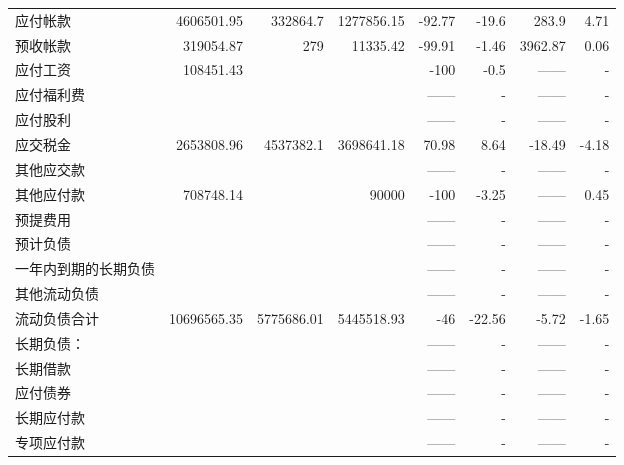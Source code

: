 \begin{longtable}{>{\scriptsize}p{9em}>{\scriptsize}r>{\scriptsize}r>{\scriptsize}r>{\scriptsize}r>{\scriptsize}r>{\scriptsize}r>{\scriptsize}r}
\hspace{2ex}	    应付帐款	&	4606501.95	&	332864.7	&	1277856.15	&	-92.77	&	-19.6	&	283.9	&	4.71	\\
\hspace{2ex}	    预收帐款	&	319054.87	&	279	&	11335.42	&	-99.91	&	-1.46	&	3962.87	&	0.06	\\
\hspace{2ex}	    应付工资	&	108451.43	&		&		&	-100	&	-0.5	&	——	&	- 	\\
\hspace{2ex}	    应付福利费	&		&		&		&	——	&	- 	&	——	&	- 	\\
\hspace{2ex}	    应付股利	&		&		&		&	——	&	- 	&	——	&	- 	\\
\hspace{2ex}	    应交税金	&	2653808.96	&	4537382.1	&	3698641.18	&	70.98	&	8.64	&	-18.49	&	-4.18	\\
\hspace{2ex}	    其他应交款	&		&		&		&	——	&	- 	&	——	&	- 	\\
\hspace{2ex}	    其他应付款	&	708748.14	&		&	90000	&	-100	&	-3.25	&	——	&	0.45	\\
\hspace{2ex}	    预提费用	&		&		&		&	——	&	- 	&	——	&	- 	\\
\hspace{2ex}	    预计负债	&		&		&		&	——	&	- 	&	——	&	- 	\\
\hspace{2ex}	    一年内到期的长期负债	&		&		&		&	——	&	- 	&	——	&	- 	\\
\hspace{2ex}	    其他流动负债	&		&		&		&	——	&	- 	&	——	&	- 	\\
\hspace{2ex}	 流动负债合计	&	10696565.35	&	5775686.01	&	5445518.93	&	-46	&	-22.56	&	-5.72	&	-1.65	\\
\midrule
\hspace{2ex}	长期负债：	&		&		&		&	——	&	- 	&	——	&	- 	\\
\hspace{2ex}	    长期借款	&		&		&		&	——	&	- 	&	——	&	- 	\\
\hspace{2ex}	    应付债券	&		&		&		&	——	&	- 	&	——	&	- 	\\
\hspace{2ex}	    长期应付款	&		&		&		&	——	&	- 	&	——	&	- 	\\
\hspace{2ex}	    专项应付款	&		&		&		&	——	&	- 	&	——	&	- 	\\

\end{longtable}
